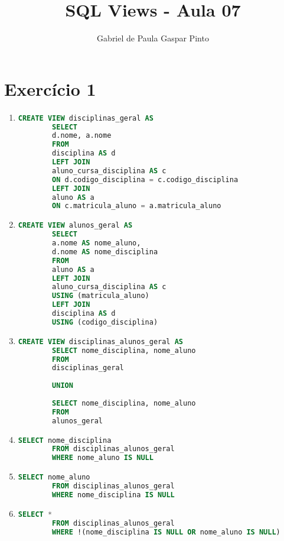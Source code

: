 \documentclass{article}
\title{SQL Views - Aula 07}
\author{Gabriel de Paula Gaspar Pinto}
\date{}
\begin{document}
\maketitle

\section*{Exercício 1}

\begin{enumerate}[label=\alph*)]

    \item 
    \begin{lstlisting}[language=SQL]
        CREATE VIEW disciplinas_geral AS
        SELECT
        d.nome, a.nome
        FROM
        disciplina AS d
        LEFT JOIN
        aluno_cursa_disciplina AS c
        ON d.codigo_disciplina = c.codigo_disciplina
        LEFT JOIN
        aluno AS a
        ON c.matricula_aluno = a.matricula_aluno
    \end{lstlisting}

    \item
    \begin{lstlisting}[language=SQL]
        CREATE VIEW alunos_geral AS
        SELECT
        a.nome AS nome_aluno,
        d.nome AS nome_disciplina
        FROM
        aluno AS a
        LEFT JOIN
        aluno_cursa_disciplina AS c
        USING (matricula_aluno)
        LEFT JOIN
        disciplina AS d
        USING (codigo_disciplina)
    \end{lstlisting}

    \item 
    \begin{lstlisting}[language=SQL]
        CREATE VIEW disciplinas_alunos_geral AS
        SELECT nome_disciplina, nome_aluno
        FROM
        disciplinas_geral
        
        UNION
        
        SELECT nome_disciplina, nome_aluno
        FROM
        alunos_geral        
    \end{lstlisting}

    \item 
    \begin{lstlisting}[language=SQL]
        SELECT nome_disciplina
        FROM disciplinas_alunos_geral
        WHERE nome_aluno IS NULL
    \end{lstlisting}

    \item 
    \begin{lstlisting}[language=SQL]
        SELECT nome_aluno
        FROM disciplinas_alunos_geral
        WHERE nome_disciplina IS NULL
    \end{lstlisting}

    \item 
    \begin{lstlisting}[language=SQL]
        SELECT *
        FROM disciplinas_alunos_geral
        WHERE !(nome_disciplina IS NULL OR nome_aluno IS NULL)        
    \end{lstlisting}

\end{enumerate}
\end{document}
